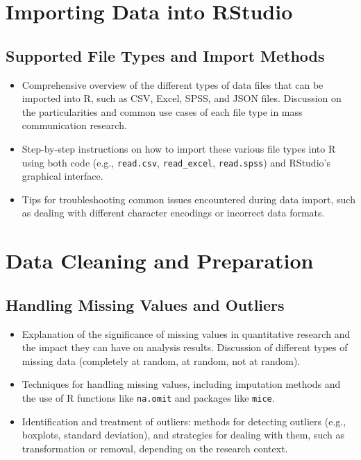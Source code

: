 \documentclass[
]{book}
\begin{document}
\hypertarget{importing-data-into-rstudio}{%
\section*{Importing Data into RStudio}\label{importing-data-into-rstudio}}

\hypertarget{supported-file-types-and-import-methods}{%
\subsection*{Supported File Types and Import Methods}\label{supported-file-types-and-import-methods}}

\begin{itemize}
\item
  Comprehensive overview of the different types of data files that can be imported into R, such as CSV, Excel, SPSS, and JSON files. Discussion on the particularities and common use cases of each file type in mass communication research.
\item
  Step-by-step instructions on how to import these various file types into R using both code (e.g., \texttt{read.csv}, \texttt{read\_excel}, \texttt{read.spss}) and RStudio's graphical interface.
\item
  Tips for troubleshooting common issues encountered during data import, such as dealing with different character encodings or incorrect data formats.
\end{itemize}

\hypertarget{data-cleaning-and-preparation}{%
\section*{Data Cleaning and Preparation}\label{data-cleaning-and-preparation}}

\hypertarget{handling-missing-values-and-outliers}{%
\subsection*{Handling Missing Values and Outliers}\label{handling-missing-values-and-outliers}}

\begin{itemize}
\item
  Explanation of the significance of missing values in quantitative research and the impact they can have on analysis results. Discussion of different types of missing data (completely at random, at random, not at random).
\item
  Techniques for handling missing values, including imputation methods and the use of R functions like \texttt{na.omit} and packages like \texttt{mice}.
\item
  Identification and treatment of outliers: methods for detecting outliers (e.g., boxplots, standard deviation), and strategies for dealing with them, such as transformation or removal, depending on the research context.
\end{itemize}
\end{document}
